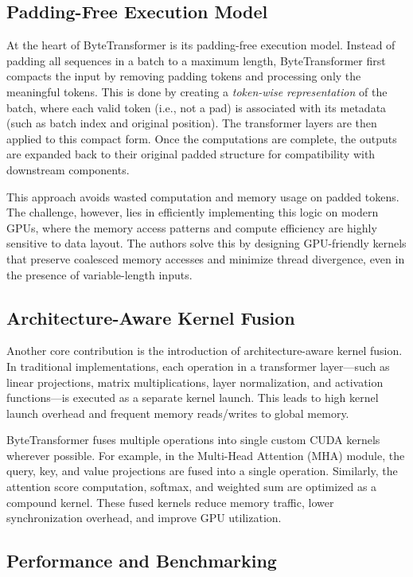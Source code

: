 \documentclass[11pt]{article}
\begin{document}
\subsection{Padding-Free Execution Model}

At the heart of ByteTransformer is its padding-free execution model. Instead of padding all sequences in a batch to a maximum length, ByteTransformer first compacts the input by removing padding tokens and processing only the meaningful tokens. This is done by creating a \textit{token-wise representation} of the batch, where each valid token (i.e., not a pad) is associated with its metadata (such as batch index and original position). The transformer layers are then applied to this compact form. Once the computations are complete, the outputs are expanded back to their original padded structure for compatibility with downstream components.

This approach avoids wasted computation and memory usage on padded tokens. The challenge, however, lies in efficiently implementing this logic on modern GPUs, where the memory access patterns and compute efficiency are highly sensitive to data layout. The authors solve this by designing GPU-friendly kernels that preserve coalesced memory accesses and minimize thread divergence, even in the presence of variable-length inputs.

\subsection{Architecture-Aware Kernel Fusion}

Another core contribution is the introduction of architecture-aware kernel fusion. In traditional implementations, each operation in a transformer layer—such as linear projections, matrix multiplications, layer normalization, and activation functions—is executed as a separate kernel launch. This leads to high kernel launch overhead and frequent memory reads/writes to global memory.

ByteTransformer fuses multiple operations into single custom CUDA kernels wherever possible. For example, in the Multi-Head Attention (MHA) module, the query, key, and value projections are fused into a single operation. Similarly, the attention score computation, softmax, and weighted sum are optimized as a compound kernel. These fused kernels reduce memory traffic, lower synchronization overhead, and improve GPU utilization.

\subsection{Performance and Benchmarking}
\end{document}
